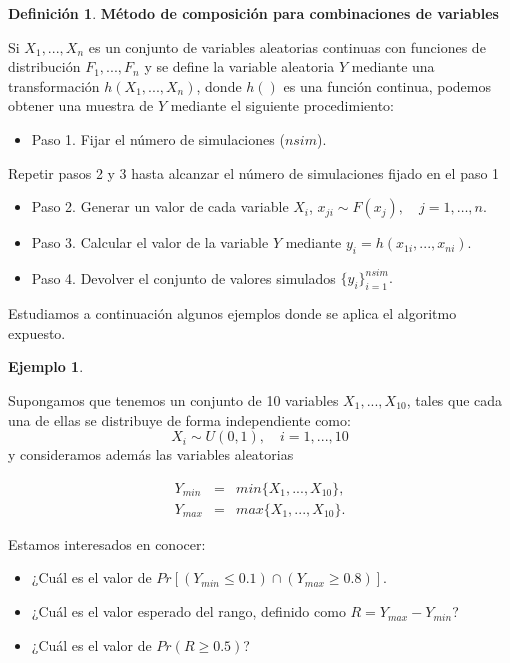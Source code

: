 \documentclass[
]{book}
\providecommand{\tightlist}{%
  \setlength{\itemsep}{0pt}\setlength{\parskip}{0pt}}
\newenvironment{yellowbox}{
  \definecolor{shadecolor}{rgb}{210, 180, 140}  
  \color{black}
  \begin{shaded}}
 {\end{shaded}}
\theoremstyle{definition}
\newtheorem{definition}{Definición}[chapter]
\theoremstyle{definition}
\newtheorem{example}{Ejemplo}[chapter]
\theoremstyle{definition}
\theoremstyle{definition}
\theoremstyle{remark}
\begin{document}
\begin{yellowbox}

\begin{definition}

\textbf{Método de composición para combinaciones de variables}

Si \(X_1,..., X_n\) es un conjunto de variables aleatorias continuas con funciones de distribución \(F_1,..., F_n\) y se define la variable aleatoria \(Y\) mediante una transformación \(h(X_1,...,X_n)\), donde \(h()\) es una función continua, podemos obtener una muestra de \(Y\) mediante el siguiente procedimiento:

\begin{itemize}
\tightlist
\item
  Paso 1. Fijar el número de simulaciones (\(nsim\)).
\end{itemize}

Repetir pasos 2 y 3 hasta alcanzar el número de simulaciones fijado en el paso 1

\begin{itemize}
\tightlist
\item
  Paso 2. Generar un valor de cada variable \(X_i\), \(x_{ji} \sim F(x_j), \quad j=1,\ldots,n\).
\item
  Paso 3. Calcular el valor de la variable \(Y\) mediante \(y_i = h(x_{1i},...,x_{ni})\).
\item
  Paso 4. Devolver el conjunto de valores simulados \(\{y_i\}_{i=1}^{nsim}.\)
\end{itemize}

\end{definition}

\end{yellowbox}

Estudiamos a continuación algunos ejemplos donde se aplica el algoritmo expuesto.

\begin{example}
\protect\hypertarget{exm:combined1}{}\label{exm:combined1}

Supongamos que tenemos un conjunto de 10 variables \(X_1,...,X_{10}\), tales que cada una de ellas se distribuye de forma independiente como: \[X_i \sim U(0,1), \quad i=1,...,10\] y consideramos además las variables aleatorias

\begin{eqnarray*}
Y_{min} &=& min\{X_1,...,X_{10}\},\\
Y_{max} &=& max\{X_1,...,X_{10}\}.
\end{eqnarray*}

Estamos interesados en conocer:

\begin{itemize}
\tightlist
\item
  ¿Cuál es el valor de \(Pr[(Y_{min} \leq 0.1) \cap (Y_{max} \geq 0.8)]\).
\item
  ¿Cuál es el valor esperado del rango, definido como \(R = Y_{max} - Y_{min}\)?
\item
  ¿Cuál es el valor de \(Pr(R \geq 0.5)\)?
\end{itemize}

\end{example}
\end{document}
